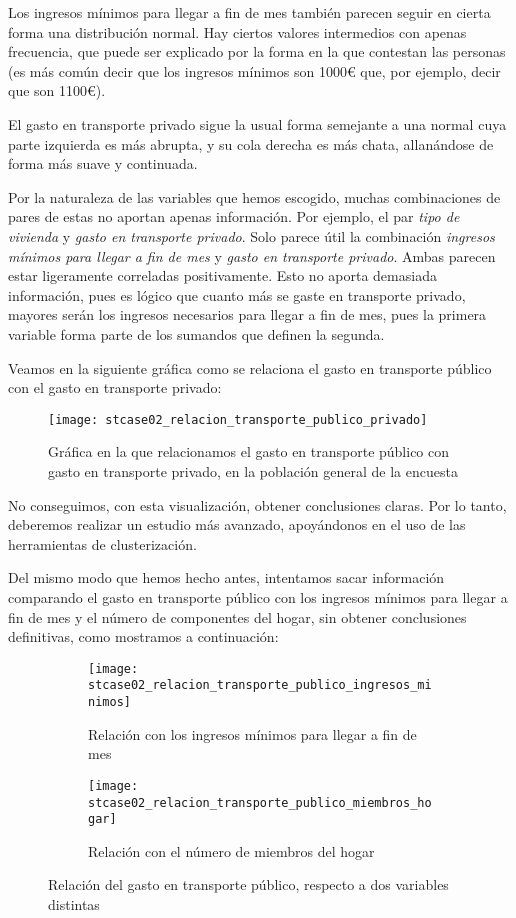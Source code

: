 \documentclass[11pt]{article}
\begin{document}
Los ingresos mínimos para llegar a fin de mes también parecen seguir en cierta forma una distribución normal. Hay ciertos valores intermedios con apenas frecuencia, que puede ser explicado por la forma en la que contestan las personas (es más común decir que los ingresos mínimos son 1000€ que, por ejemplo, decir que son 1100€).

El gasto en transporte privado sigue la usual forma semejante a una normal cuya parte izquierda es más abrupta, y su cola derecha es más chata, allanándose de forma más suave y continuada.

Por la naturaleza de las variables que hemos escogido, muchas combinaciones de pares de estas no aportan apenas información. Por ejemplo, el par \emph{tipo de vivienda} y \emph{gasto en transporte privado}. Solo parece útil la combinación \emph{ingresos mínimos para llegar a fin de mes} y \emph{gasto en transporte privado}. Ambas parecen estar ligeramente correladas positivamente. Esto no aporta demasiada información, pues es lógico que cuanto más se gaste en transporte privado, mayores serán los ingresos necesarios para llegar a fin de mes, pues la primera variable forma parte de los sumandos que definen la segunda.

Veamos en la siguiente gráfica como se relaciona el gasto en transporte público con el gasto en transporte privado:

\begin{figure}[H]
    \centering

    \texttt{[image: stcase02\_relacion\_transporte\_publico\_privado]}
    \caption{Gráfica en la que relacionamos el gasto en transporte público con gasto en transporte privado, en la población general de la encuesta}
\end{figure}

No conseguimos, con esta visualización, obtener conclusiones claras. Por lo tanto, deberemos realizar un estudio más avanzado, apoyándonos en el uso de las herramientas de clusterización.

Del mismo modo que hemos hecho antes, intentamos sacar información comparando el gasto en transporte público con los ingresos mínimos para llegar a fin de mes y el número de componentes del hogar, sin obtener conclusiones definitivas, como mostramos a continuación:

\begin{figure}[H]
    \centering

    \begin{subfigure}[b]{0.45 \textwidth}
        \texttt{[image: stcase02\_relacion\_transporte\_publico\_ingresos\_minimos]}
        \caption{Relación con los ingresos mínimos para llegar a fin de mes}
    \end{subfigure}
    \begin{subfigure}[b]{0.45 \textwidth}
        \texttt{[image: stcase02\_relacion\_transporte\_publico\_miembros\_hogar]}
        \caption{Relación con el número de miembros del hogar}
    \end{subfigure}

    \caption{Relación del gasto en transporte público, respecto a dos variables distintas}
\end{figure}
\end{document}
